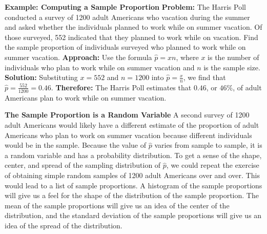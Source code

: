 \documentclass{report}
\begin{document}
     \begin{mdframed}
       \textbf{Example: Computing a Sample Proportion}
       \bigbreak \noindent 
       \textbf{Problem:}
       \bigbreak \noindent 
       The Harris Poll conducted a survey of 1200 adult Americans who vacation during the summer and asked whether the individuals planned to work while on summer vacation. Of those surveyed, 552 indicated that they planned to work while on vacation. Find the sample proportion of individuals surveyed who planned to work while on summer vacation.
       \bigbreak \noindent 
       \textbf{Approach:}
       Use the formula $\hat{p} = xn $, where $x $ is the number of individuals who plan to work while on summer vacation and $n$ is the sample size.
       \bigbreak \noindent 
       \textbf{Solution:}
       \bigbreak \noindent 
       Substituting $x=552$ and $n=1200$ into $\hat{p}=\frac{x}{n}$, we find that $\hat{p}=\frac{552}{1200}=0.46$.
       \bigbreak \noindent 
       \textbf{Therefore:}
        The Harris Poll estimates that $0.46$, or $46\%$, of adult Americans plan to work while on summer vacation.
     \end{mdframed}

     \bigbreak \noindent \bigbreak \noindent 
     \textbf{The Sample Proportion is a Random Variable}
     \bigbreak \noindent 
     A second survey of 1200 adult Americans would likely have a different estimate of the proportion of adult Americans who plan to work on summer vacation because different individuals would be in the sample. Because the value of $\hat{p}$ varies from sample to sample, it is a random variable and has a probability distribution.
     \bigbreak \noindent 
        To get a sense of the shape, center, and spread of the sampling distribution of $\hat{p}$, we could repeat the exercise of obtaining simple random samples of 1200 adult Americans over and over. This would lead to a list of sample proportions. A histogram of the sample proportions will give us a feel for the shape of the distribution of the sample proportion. The mean of the sample proportions will give us an idea of the center of the distribution, and the standard deviation of the sample proportions will give us an idea of the spread of the distribution.
\end{document}
